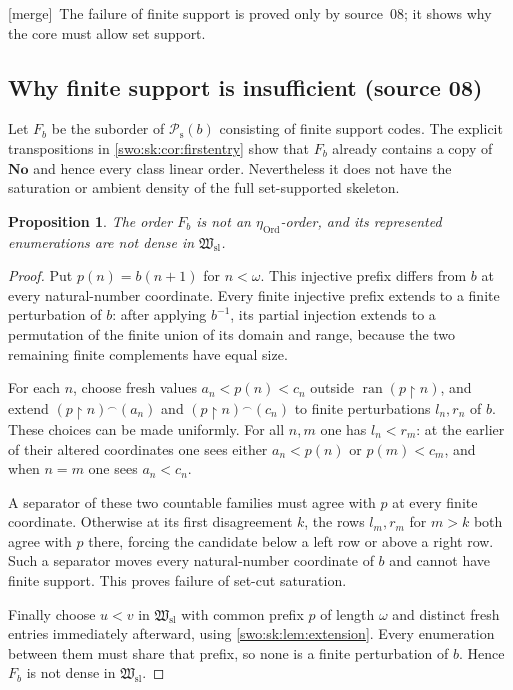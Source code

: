 \documentclass[11pt]{article}
\newtheorem{proposition}[proposition]{Proposition}
\theoremstyle{definition}
\theoremstyle{remark}
\newcommand{\No}{\mathbf{No}}
\newcommand{\Ord}{\mathrm{Ord}}
\newcommand{\Hsl}{\mathfrak W_{\mathrm{sl}}}
\newcommand{\Psupp}{\mathcal P_{\mathrm{s}}}
\newcommand{\ran}{\operatorname{ran}}
\newcommand{\cat}{\mathbin{{}^\frown}}
\newcommand{\restr}{\mathbin{\upharpoonright}}
\newcommand{\merge}{\textsf{[merge]}}
\begin{document}

\merge\ The failure of finite support is proved only by source~08; it shows
why the core must allow set support.

\subsection{Why finite support is insufficient (source 08)}

Let $F_b$ be the suborder of $\Psupp(b)$ consisting of finite support
codes. The explicit transpositions in \cref{swo:sk:cor:firstentry} show that
$F_b$ already contains a copy of $\No$ and hence every class linear
order. Nevertheless it does not have the saturation or ambient density
of the full set-supported skeleton.

\begin{proposition}\label{swo:sk:prop:finitesupport}
The order $F_b$ is not an $\eta_{\Ord}$-order, and its represented
enumerations are not dense in $\Hsl$.
\end{proposition}
\begin{proof}
Put $p(n)=b(n+1)$ for $n<\omega$. This injective prefix differs from
$b$ at every natural-number coordinate. Every finite injective prefix
extends to a finite perturbation of $b$: after applying $b^{-1}$, its
partial injection extends to a permutation of the finite union of its
domain and range, because the two remaining finite complements have
equal size.

For each $n$, choose fresh values $a_n<p(n)<c_n$ outside
$\ran(p\restr n)$, and extend
$(p\restr n)\cat(a_n)$ and $(p\restr n)\cat(c_n)$ to finite
perturbations $l_n,r_n$ of $b$. These choices can be made uniformly.
For all $n,m$ one has $l_n<r_m$: at the earlier of their altered
coordinates one sees either $a_n<p(n)$ or $p(m)<c_m$, and when
$n=m$ one sees $a_n<c_n$.

A separator of these two countable families must agree with $p$ at
every finite coordinate. Otherwise at its first disagreement $k$, the
rows $l_m,r_m$ for $m>k$ both agree with $p$ there, forcing the
candidate below a left row or above a right row. Such a separator
moves every natural-number coordinate of $b$ and cannot have finite
support. This proves failure of set-cut saturation.

Finally choose $u<v$ in $\Hsl$ with common prefix $p$ of length $\omega$
and distinct fresh entries immediately afterward, using
\cref{swo:sk:lem:extension}. Every enumeration between them must share that
prefix, so none is a finite perturbation of $b$. Hence $F_b$ is not
dense in $\Hsl$.
\end{proof}
\end{document}
